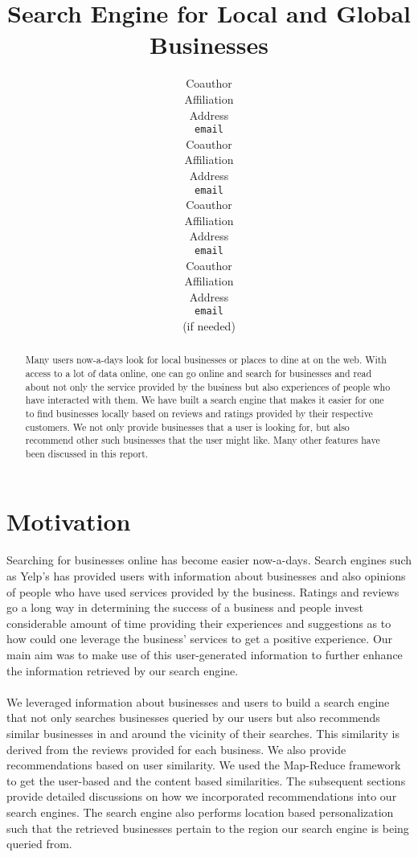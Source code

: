 \documentclass{article} %
\title{Search Engine for Local and Global Businesses }
\author{
Coauthor \\
Affiliation \\
Address \\
\texttt{email} \\
\AND
Coauthor \\
Affiliation \\
Address \\
\texttt{email} \\
\And
Coauthor \\
Affiliation \\
Address \\
\texttt{email} \\
\And
Coauthor \\
Affiliation \\
Address \\
\texttt{email} \\
(if needed)\\
}
\begin{document}
\maketitle

\begin{abstract}
Many users now-a-days look for local businesses or places to dine at on the web. With access to a lot of data online, one can go online and search for businesses and read about not only the service provided by the business but also experiences of people who have interacted with them. We have built a search engine that makes it easier for one to find businesses locally based on reviews and ratings provided by their respective customers. We not only provide businesses that a user is looking for, but also recommend other such businesses that the user might like. Many other features have been discussed in this report.
\end{abstract}

\section{Motivation}

\paragraph{}Searching for businesses online has become easier now-a-days. Search engines such as Yelp's has provided users with information about businesses and also opinions of people who have used services provided by the business. Ratings and reviews go a long way in determining the success of a business and people invest considerable amount of time providing their experiences and suggestions as to how could one leverage the business' services to get a positive experience. Our main aim was to make use of this user-generated information to further enhance the information retrieved by our search engine. 

\paragraph{}We leveraged information about businesses and users to build a search engine that not only searches businesses queried by our users but also recommends similar businesses in and around the vicinity of their searches. This similarity is derived from the reviews provided for each business. We also provide recommendations based on user similarity. We used the Map-Reduce framework to get the user-based and the content based similarities. The subsequent sections provide detailed discussions on how we incorporated recommendations into our search engines. The search engine also performs location based personalization such that the retrieved businesses pertain to the region our search engine is being queried from.
\end{document}
